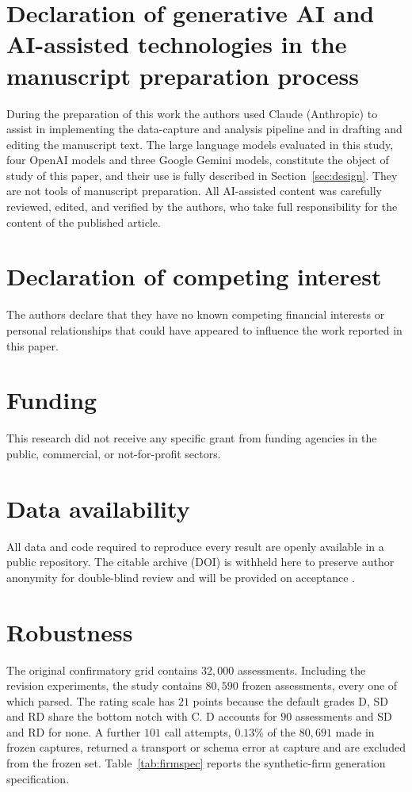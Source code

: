 \documentclass[a4paper,fleqn]{cas-sc}
\begin{document}
\section*{Declaration of generative AI and AI-assisted technologies in the manuscript preparation process}
During the preparation of this work the authors used Claude (Anthropic) to assist in implementing the
data-capture and analysis pipeline and in drafting and editing the manuscript text. The large language
models evaluated in this study, four OpenAI models and three Google Gemini models, constitute the
object of study of this paper, and their use is fully described in Section~\ref{sec:design}. They are
not tools of manuscript preparation. All AI-assisted content was carefully reviewed, edited, and
verified by the authors, who take full responsibility for the content of the published article.

\section*{Declaration of competing interest}
The authors declare that they have no known competing financial interests or personal relationships
that could have appeared to influence the work reported in this paper.

\section*{Funding}
This research did not receive any specific grant from funding agencies in the public, commercial, or
not-for-profit sectors.

\section*{Data availability}
All data and code required to reproduce every result are openly available in a public repository.
The citable archive (DOI) is withheld here to preserve author anonymity for double-blind review and
will be provided on acceptance \citep{artifact2026}.

\appendix
\section{Robustness}\label{app:robust}
The original confirmatory grid contains $32{,}000$ assessments. Including the revision experiments,
the study contains $80{,}590$ frozen assessments, every one of which parsed. The rating scale has $21$ points because the default grades D, SD and RD share the bottom notch with C. D accounts for $90$ assessments and SD and RD for none. A further $101$ call attempts, $0.13$\% of the $80{,}691$ made in frozen captures, returned a transport or schema error at capture and are excluded from the frozen set. Table~\ref{tab:firmspec}
reports the synthetic-firm generation specification.
\end{document}
